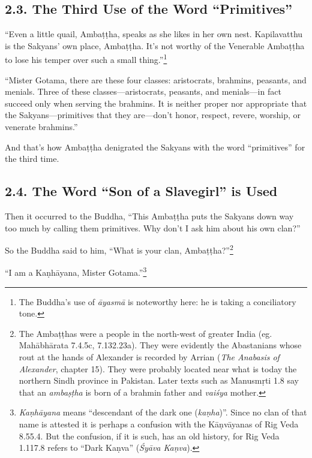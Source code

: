 \documentclass[12pt,openany]{book}%
\begin{document}
\subsection*{2.3. The Third Use of the Word “Primitives” }

“Even a little quail, \textsanskrit{Ambaṭṭha}, speaks as she likes in her own nest. Kapilavatthu is the Sakyans’ own place, \textsanskrit{Ambaṭṭha}. It’s not worthy of the Venerable \textsanskrit{Ambaṭṭha} to lose his temper over such a small thing.”\footnote{The Buddha’s use of \textit{\textsanskrit{āyasmā}} is noteworthy here: he is taking a conciliatory tone. } 

“Mister Gotama, there are these four classes: aristocrats, brahmins, peasants, and menials. Three of these classes—aristocrats, peasants, and menials—in fact succeed only when serving the brahmins. It is neither proper nor appropriate that the Sakyans—primitives that they are—don’t honor, respect, revere, worship, or venerate brahmins.” 

And that’s how \textsanskrit{Ambaṭṭha} denigrated the Sakyans with the word “primitives” for the third time. 

\subsection*{2.4. The Word “Son of a Slavegirl” is Used }

Then it occurred to the Buddha, “This \textsanskrit{Ambaṭṭha} puts the Sakyans down way too much by calling them primitives. Why don’t I ask him about his own clan?” 

So the Buddha said to him, “What is your clan, \textsanskrit{Ambaṭṭha}?”\footnote{The \textsanskrit{Ambaṭṭhas} were a people in the north-west of greater India (eg. \textsanskrit{Mahābhārata} 7.4.5c, 7.132.23a). They were evidently the Abastanians whose rout at the hands of Alexander is recorded by Arrian (\emph{The Anabasis of Alexander}, chapter 15). They were probably located near what is today the northern Sindh province in Pakistan. Later texts such as \textsanskrit{Manusmṛti} 1.8 say that an \textit{\textsanskrit{ambaṣṭha}} is born of a brahmin father and \textit{\textsanskrit{vaiśya}} mother. } 

“I am a \textsanskrit{Kaṇhāyana}, Mister Gotama.”\footnote{\textit{\textsanskrit{Kaṇhāyana}} means “descendant of the dark one (\textit{\textsanskrit{kaṇha}})”. Since no clan of that name is attested it is perhaps a confusion with the \textsanskrit{Kāṇvāyanas} of Rig Veda 8.55.4. But the confusion, if it is such, has an old history, for Rig Veda 1.117.8 refers to “Dark \textsanskrit{Kaṇva}” (\textit{\textsanskrit{Śyāva} \textsanskrit{Kaṇva}}). } 
\end{document}
